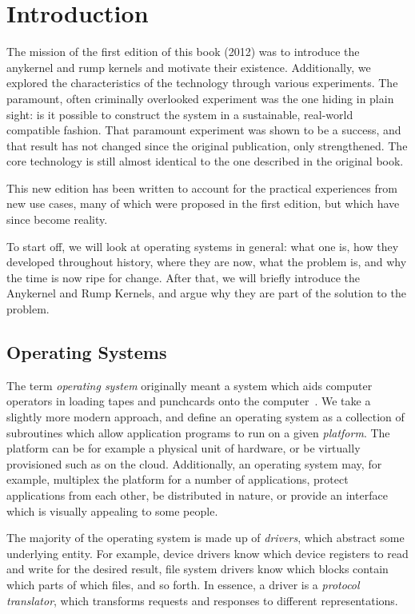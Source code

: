 
\section{Introduction}
\label{chap:introduction}

The mission of the first edition of this book (2012) was to introduce
the anykernel and rump kernels and motivate their existence.  Additionally, we explored
the characteristics of the technology through various experiments.
The paramount, often criminally overlooked experiment was the one hiding in
plain sight: is it possible to construct the system in a sustainable,
real-world compatible fashion.  That paramount experiment was shown
to be a success, and that result has not changed since the original
publication, only strengthened.  The core technology is still almost
identical to the one described in the original book.

This new edition has been written to account for the practical experiences
from new use cases, many of which were proposed in the first edition,
but which have since become reality.

To start off, we will look at operating systems in general: what one is,
how they developed throughout history, where they are now, what the
problem is, and why the time is now ripe for change.  After that, we
will briefly introduce the Anykernel and Rump Kernels, and argue why
they are part of the solution to the problem.


\subsection{Operating Systems}

The term \textit{operating system} originally meant a system which aids
computer operators in loading tapes and punchcards onto the
computer~\cite{dijkstra:ewd1303}.  We take a slightly more modern
approach, and define an operating system as a collection
of subroutines which allow application programs to run on a given
\textit{platform}.  The platform can be for example a physical unit of
hardware, or be virtually provisioned such as on the cloud.  Additionally,
an operating system may, for example, multiplex the platform for a number
of applications, protect applications from each other, be distributed
in nature, or provide an interface which is visually appealing to
some people.

The majority of the operating system is made up of \textit{drivers},
which abstract some underlying entity.  For example, device drivers
know which device registers to read and write for the desired result,
file system drivers know which blocks contain which parts of which files,
and so forth.  In essence, a driver is a \textit{protocol translator},
which transforms requests and responses to different representations.

